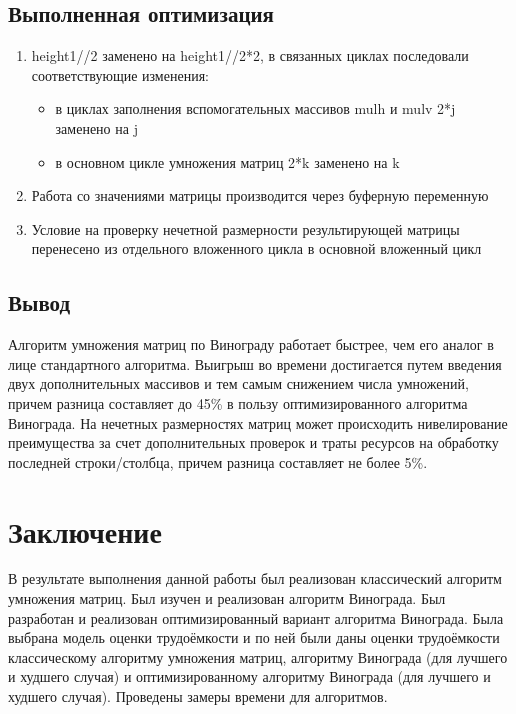\documentclass[a4paper,12pt]{report}
\begin{document}
	\section{Выполненная оптимизация}

        	\begin{enumerate}
	    		\item height1//2 заменено на height1//2*2, в связанных циклах последовали соответствующие изменения:\\
	    		\begin{itemize}
	    			\item в циклах заполнения вспомогательных массивов mulh и mulv 2*j заменено на j\\
	    			\item в основном цикле умножения матриц 2*k заменено на k\\
	    		\end{itemize}
	    		\item Работа со значениями матрицы производится через буферную переменную\\
	    		\item Условие на проверку нечетной размерности результирующей матрицы перенесено из отдельного вложенного цикла в основной вложенный цикл 
	    	\end{enumerate}
    	
    \section{Вывод}

        Алгоритм умножения матриц по Винограду работает быстрее, чем его аналог в лице стандартного алгоритма. 
        Выигрыш во времени достигается путем введения двух дополнительных массивов и тем самым снижением числа умножений, причем разница составляет до 45\% в пользу оптимизированного алгоритма Винограда. 
        На нечетных размерностях матриц может происходить нивелирование преимущества за счет дополнительных проверок и траты ресурсов на обработку последней строки/столбца, причем разница составляет не более 5\%. 

    \newpage

    \chapter*{Заключение}
        \label{sec:conclusion_part}

			В результате выполнения данной работы был реализован классический алгоритм умножения матриц. 
			Был изучен и реализован алгоритм Винограда. 
			Был разработан и реализован оптимизированный вариант алгоритма Винограда. 
			Была выбрана модель оценки трудоёмкости и по ней были даны оценки трудоёмкости классическому алгоритму умножения матриц, алгоритму Винограда (для лучшего и худшего случая) и оптимизированному алгоритму Винограда (для лучшего и худшего случая). 
			Проведены замеры времени для алгоритмов. 
			
\end{document}
